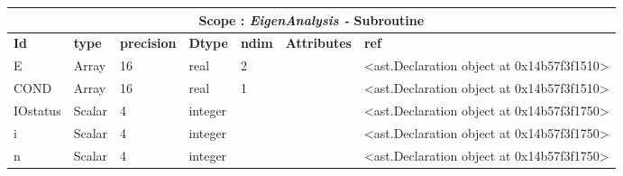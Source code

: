 \documentclass{report}
\begin{document}
 \vspace{1cm}

\begin{center}
\begin{longtable}{|p{3.5cm}|p{1.5cm}|p{1.5cm}|p{1.5cm}|p{1cm}|p{2cm}|p{4cm}| }
\hline
\multicolumn{7}{|c|}{\textbf{Scope : \qquad}  \textbf{\textit{EigenAnalysis - }Subroutine}}\\ 
\hline
\textbf{Id} & \textbf{type} & \textbf{precision} & \textbf{Dtype} & \textbf{ndim} & \textbf{Attributes} & \textbf{ref} \\\hline

E & Array & 16 & real & 2 &  & <ast.Declaration object at 0x14b57f3f1510> \\\hline

COND & Array & 16 & real & 1 &  & <ast.Declaration object at 0x14b57f3f1510> \\\hline

IOstatus & Scalar & 4 & integer &  &  & <ast.Declaration object at 0x14b57f3f1750> \\\hline

i & Scalar & 4 & integer &  &  & <ast.Declaration object at 0x14b57f3f1750> \\\hline

n & Scalar & 4 & integer &  &  & <ast.Declaration object at 0x14b57f3f1750> \\\hline

\end{longtable}
\end{center}

 \vspace{1cm}
\end{document}

